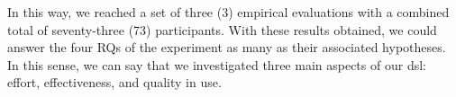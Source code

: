 In this way, we reached a set of three (3) empirical evaluations with a combined total of seventy-three (73) participants.
With these results obtained, we could answer the four RQs of the experiment as many as their associated hypotheses.
In this sense, we can say that we investigated three main aspects of our \ac{dsl}: effort, effectiveness, and quality in use.

